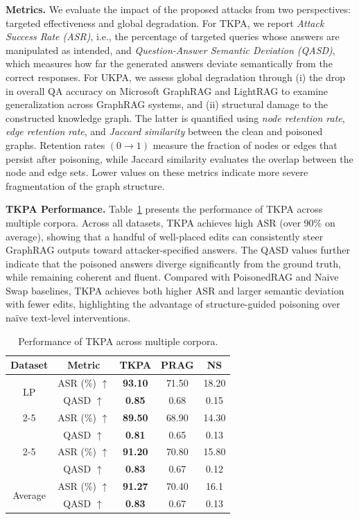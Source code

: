 \documentclass[letterpaper]{article} %
\begin{document}
\textbf{Metrics.}
We evaluate the impact of the proposed attacks from two perspectives: targeted effectiveness and global degradation.
For TKPA, we report \emph{Attack Success Rate (ASR)}, i.e., the percentage of targeted queries whose answers are manipulated as intended, and \emph{Question-Answer Semantic Deviation (QASD)}, which measures how far the generated answers deviate semantically from the correct responses.
For UKPA, we assess global degradation through (i) the drop in overall QA accuracy on Microsoft GraphRAG and LightRAG to examine generalization across GraphRAG systems, and (ii) structural damage to the constructed knowledge graph.
The latter is quantified using \emph{node retention rate}, \emph{edge retention rate}, and \emph{Jaccard similarity} between the clean and poisoned graphs.
Retention rates $(0\to1)$ measure the fraction of nodes or edges that persist after poisoning, while Jaccard similarity evaluates the overlap between the node and edge sets.
Lower values on these metrics indicate more severe fragmentation of the graph structure.

\textbf{TKPA Performance.}
Table~\ref{tab:whitebox_performance_revised} presents the performance of TKPA across multiple corpora.
Across all datasets, TKPA achieves high ASR (over 90\% on average),
showing that a handful of well-placed edits can consistently steer GraphRAG outputs
toward attacker-specified answers.
The QASD values further indicate that the poisoned answers diverge significantly
from the ground truth, while remaining coherent and fluent.
Compared with PoisonedRAG and Naive Swap baselines,
TKPA achieves both higher ASR and larger semantic deviation with fewer edits,
highlighting the advantage of structure-guided poisoning over naïve text-level interventions.
\begin{table}[t]
\centering
\small %
\begin{tabular}{ccccc}
\toprule
\textbf{Dataset} & \textbf{Metric} & \textbf{TKPA} & \textbf{PRAG} & \textbf{NS} \\
\midrule
\multirow{2}{*}{LP}   & ASR (\%) $\uparrow$ & \textbf{93.10} & 71.50 & 18.20 \\   
& QASD $\uparrow$      & \textbf{0.85} & 0.68 & 0.15 \\
\cmidrule(l){2-5}
\multirow{2}{*}{FC08} 
& ASR (\%) $\uparrow$ & \textbf{89.50} & 68.90 & 14.30 \\
& QASD $\uparrow$      & \textbf{0.81} & 0.65 & 0.13 \\ 
\cmidrule(l){2-5}
\multirow{2}{*}{JAPB} 
& ASR (\%) $\uparrow$ & \textbf{91.20} & 70.80 & 15.80 \\  
& QASD $\uparrow$      & \textbf{0.83} & 0.67 & 0.12 \\  
\midrule
\multirow{2}{*}{Average}
& ASR (\%) $\uparrow$ & \textbf{91.27} & 70.40 & 16.1 \\
& QASD $\uparrow$      & \textbf{0.83} & 0.67 & 0.13 \\
\bottomrule
\end{tabular}
\caption{Performance of TKPA across multiple corpora.}
\label{tab:whitebox_performance_revised}
\end{table}
\end{document}
